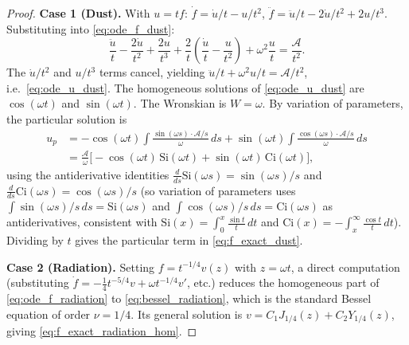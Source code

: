 \documentclass[12pt,a4paper]{article}
\theoremstyle{definition}
\theoremstyle{remark}
\begin{document}
\begin{proof}
\textbf{Case 1 (Dust).}
With $u = tf$: $\dot{f} = \dot{u}/t - u/t^2$,
$\ddot{f} = \ddot{u}/t - 2\dot{u}/t^2 + 2u/t^3$.
Substituting into \eqref{eq:ode_f_dust}:
\[
\frac{\ddot{u}}{t} - \frac{2\dot{u}}{t^2} + \frac{2u}{t^3}
+ \frac{2}{t}\!\left(\frac{\dot{u}}{t}-\frac{u}{t^2}\right)
+ \omega^2\frac{u}{t}
= \frac{\mathcal{A}}{t^2}.
\]
The $\dot{u}/t^2$ and $u/t^3$ terms cancel, yielding
$\ddot{u}/t + \omega^2 u/t = \mathcal{A}/t^2$, i.e.\ \eqref{eq:ode_u_dust}.
The homogeneous solutions of \eqref{eq:ode_u_dust} are
$\cos(\omega t)$ and $\sin(\omega t)$.
The Wronskian is $W = \omega$.
By variation of parameters, the particular solution is
\begin{align*}
u_p &= -\cos(\omega t)\int\frac{\sin(\omega s)\cdot\mathcal{A}/s}{\omega}\,ds
       +\sin(\omega t)\int\frac{\cos(\omega s)\cdot\mathcal{A}/s}{\omega}\,ds \\
    &= \frac{\mathcal{A}}{\omega}\bigl[-\cos(\omega t)\,\mathrm{Si}(\omega t)
       + \sin(\omega t)\,\mathrm{Ci}(\omega t)\bigr],
\end{align*}
using the antiderivative identities
$\tfrac{d}{ds}\mathrm{Si}(\omega s)=\sin(\omega s)/s$ and
$\tfrac{d}{ds}\mathrm{Ci}(\omega s)=\cos(\omega s)/s$
(so variation of parameters uses $\int\sin(\omega s)/s\,ds = \mathrm{Si}(\omega s)$
and $\int\cos(\omega s)/s\,ds = \mathrm{Ci}(\omega s)$ as antiderivatives,
consistent with $\mathrm{Si}(x)=\int_0^x\tfrac{\sin t}{t}\,dt$ and
$\mathrm{Ci}(x)=-\int_x^\infty\tfrac{\cos t}{t}\,dt$).
Dividing by $t$ gives the particular term in \eqref{eq:f_exact_dust}.

\textbf{Case 2 (Radiation).}
Setting $f = t^{-1/4}v(z)$ with $z=\omega t$, a direct computation
(substituting $\dot{f} = -\tfrac{1}{4}t^{-5/4}v + \omega t^{-1/4}v'$, etc.)
reduces the homogeneous part of \eqref{eq:ode_f_radiation} to \eqref{eq:bessel_radiation},
which is the standard Bessel equation of order $\nu = 1/4$.
Its general solution is $v = C_1 J_{1/4}(z) + C_2 Y_{1/4}(z)$,
giving \eqref{eq:f_exact_radiation_hom}.
\end{proof}
\end{document}
